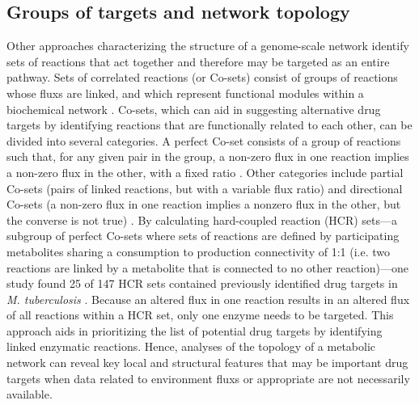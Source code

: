\subsection{Groups of targets and network topology}
Other approaches characterizing the structure of a genome-scale 
network  identify sets of reactions that act 
together and therefore may be targeted as an entire pathway. 
Sets of correlated reactions (or Co-sets) consist of groups 
of reactions whose \glspl{flux} are linked, and which represent 
functional modules within a biochemical network \cite{Papin:2004eh}. Co-sets, 
which can aid in suggesting alternative drug targets by 
identifying reactions that are functionally related to each 
other, can be divided into several categories. A perfect 
Co-set consists of a group of reactions such that, for any 
given pair in the group, a non-zero \gls{flux} in one reaction 
implies a non-zero \gls{flux} in the other, with a fixed ratio . 
Other categories include partial Co-sets (pairs of linked 
reactions, but with a variable \gls{flux} ratio) and directional 
Co-sets (a non-zero \gls{flux} in one reaction implies a nonzero 
\gls{flux} in the other, but the converse is not true) \cite{Xi:2011gc}. By 
calculating hard-coupled reaction (HCR) sets---a subgroup 
of perfect Co-sets where sets of reactions are defined by 
participating metabolites sharing a consumption to production 
connectivity of 1:1 (i.e. two reactions are linked by a 
metabolite that is connected to no other reaction)---one study 
found 25 of 147 HCR sets contained previously identified drug targets 
in \textit{M. tuberculosis} \cite{Jamshidi:2007ei}. Because an altered \gls{flux} in one reaction 
results in an altered \gls{flux} of all reactions within a HCR set, only 
one enzyme needs to be targeted. This approach aids in prioritizing 
the list of potential drug targets by identifying linked enzymatic 
reactions. Hence, analyses of the topology of a metabolic network 
can reveal key local and structural features that may be important 
drug targets when data related to environment \glspl{flux} or appropriate 
 are not necessarily available.



